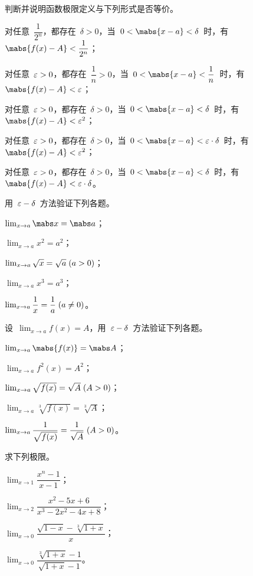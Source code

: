 \begin{exercise}
\item 判断并说明函数极限定义与下列形式是否等价。
\begin{exlist}
  \item 对任意~$\dfrac1{2^n}$，都存在~$\delta>0$，当~$0<\mabs{x-a}<\delta$~时，有~$\mabs{f(x)-A}<\dfrac1{2^n}$；
  \item 对任意~$\varepsilon>0$，都存在~$\dfrac1n>0$，当~$0<\mabs{x-a}<\dfrac1n$~时，有~$\mabs{f(x)-A}<\e$；
  \item 对任意~$\varepsilon>0$，都存在~$\delta>0$，当~$0<\mabs{x-a}<\delta$~时，有~$\mabs{f(x)-A}<\e^2$；
  \item 对任意~$\varepsilon>0$，都存在~$\delta>0$，当~$0<\mabs{x-a}<\e\cdot\delta$~时，有~$\mabs{f(x)-A}<\e^2$；
  \item 对任意~$\varepsilon>0$，都存在~$\delta>0$，当~$0<\mabs{x-a}<\delta$~时，有~$\mabs{f(x)-A}<\e\cdot\delta$。
\end{exlist}
\item 用~$\varepsilon-\delta$~方法验证下列各题。
\begin{exlistcols}[3]
  \item $\lim_{x\to a}\mabs x=\mabs a$；
  \item $\lim_{x\to a}x^2=a^2$；
  \item $\lim_{x\to a}\sqrt x=\sqrt a\mcond{a>0}$；
  \item $\lim_{x\to a}x^3=a^3$；
  \item $\lim_{x\to a}\dfrac1x=\dfrac1a\mcond{a\neq0}$。
\end{exlistcols}
\item 设~$\lim_{x\to a}f(x)=A$，用~$\varepsilon-\delta$~方法验证下列各题。
\begin{exlistcols}
  \item $\lim_{x\to a}\mabs{f(x)}=\mabs A$；
  \item $\lim_{x\to a}f^2(x)=A^2$；
  \item $\lim_{x\to a}\sqrt{f(x)}=\sqrt A\mcond{A>0}$；
  \item $\lim_{x\to a}\sqrt[3]{f(x)}=\sqrt[3]A$；
  \item $\lim_{x\to a}\dfrac1{\sqrt{f(x)}}=\dfrac1{\sqrt A}\mcond{A>0}$。
\end{exlistcols}
\item 求下列极限。
\begin{exlistcols}
  \item $\lim_{x\to1}\dfrac{x^n-1}{x-1}$；
  \item $\lim_{x\to2}\dfrac{x^2-5x+6}{x^3-2x^2-4x+8}$；
  \item $\lim_{x\to0}\dfrac{\sqrt{1-x}-\sqrt[3]{1+x}}x$；
  \item $\lim_{x\to0}\dfrac{\sqrt[3]{1+x}-1}{\sqrt{1+x}-1}$。
\end{exlistcols}
\end{exercise}


